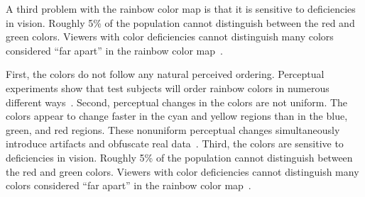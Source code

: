 \documentclass{llncs}
\newcommand{\lcite}[1]{~\cite{#1}}
\begin{document}
{  A third problem with the rainbow color map is that it is sensitive to
  deficiencies in vision.  Roughly 5\% of the population cannot distinguish
  between the red and green colors.  Viewers with color deficiencies cannot
  distinguish many colors considered ``far apart'' in the rainbow color
  map\lcite{Light04}.

}{

  First, the colors do not follow any natural
  perceived ordering.  Perceptual experiments show that test subjects will
  order rainbow colors in numerous different ways\lcite{Ware04}.  Second,
  perceptual changes in the colors are not uniform.  The colors appear to
  change faster in the cyan and yellow regions than in the blue, green, and
  red regions.  These nonuniform perceptual changes simultaneously
  introduce artifacts and obfuscate real data\lcite{Borland07}.  Third, the
  colors are sensitive to deficiencies in vision.  Roughly 5\% of the
  population cannot distinguish between the red and green colors.  Viewers
  with color deficiencies cannot distinguish many colors considered ``far
  apart'' in the rainbow color map\lcite{Light04}.

}
\end{document}
